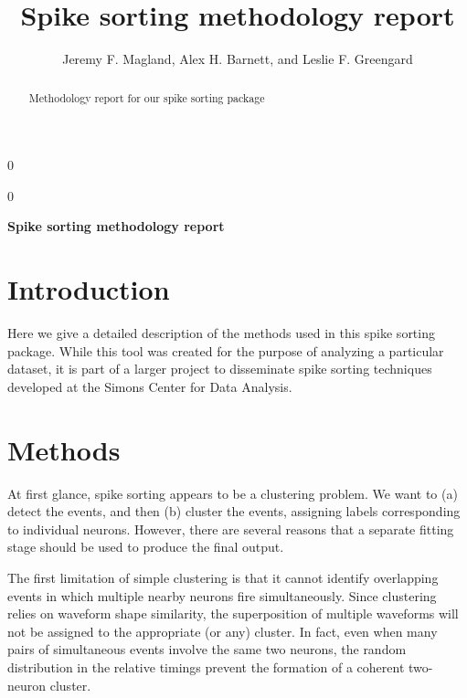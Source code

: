 \documentclass[10pt]{article}
\newcommand{\blind}{0}
\begin{document}
%

\def\spacingset#1{\renewcommand{\baselinestretch}%
{#1}\small\normalsize} \spacingset{1}


\blind
{
  \title{\bf Spike sorting methodology report}
  \author{Jeremy F. Magland, Alex H. Barnett, and Leslie F. Greengard}
  \maketitle
} \fi

\blind
{
  \bigskip
  \bigskip
  \bigskip
  \begin{center}
    {\LARGE\bf Spike sorting methodology report}
  \end{center}
  \medskip
} \fi

\bigskip
\begin{abstract}
Methodology report for our spike sorting package
\end{abstract}


\newcommand{\norm}[1]{\left\lVert#1\right\rVert}

\newpage
\spacingset{1.45} %

\section {Introduction}

Here we give a detailed description of the methods used in this spike sorting package. While this tool was created for the purpose of analyzing a particular dataset, it is part of a larger project to disseminate spike sorting techniques developed at the Simons Center for Data Analysis.

\section {Methods}

At first glance, spike sorting appears to be a clustering problem. We want to (a) detect the events, and then (b) cluster the events, assigning labels corresponding to individual neurons. However, there are several reasons that a separate fitting stage should be used to produce the final output.

The first limitation of simple clustering is that it cannot identify overlapping events in which multiple nearby neurons fire simultaneously. Since clustering relies on waveform shape similarity, the superposition of multiple waveforms will not be assigned to the appropriate (or any) cluster. In fact, even when many pairs of simultaneous events involve the same two neurons, the random distribution in the relative timings prevent the formation of a coherent two-neuron cluster.
\end{document}
